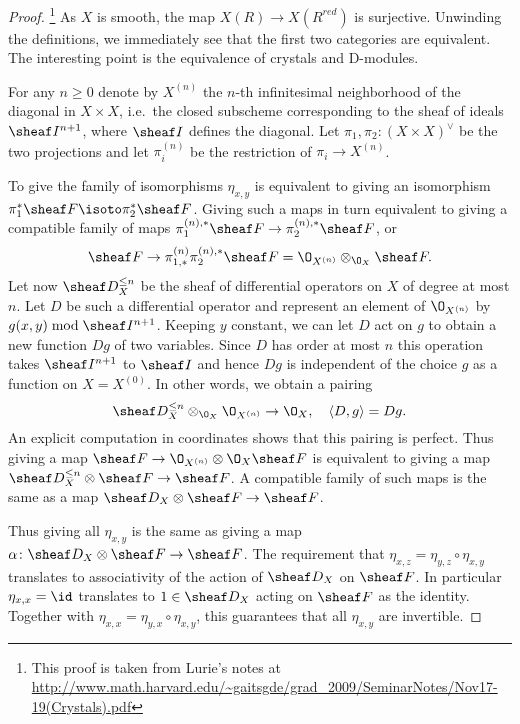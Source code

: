 \documentclass{ck-article}
\begin{document}
\begin{proof}\footnote{This proof is taken from Lurie's notes at \url{http://www.math.harvard.edu/~gaitsgde/grad_2009/SeminarNotes/Nov17-19(Crystals).pdf}}
    As $X$ is smooth, the map $X(R) \to X(R^{red})$ is surjective.
    Unwinding the definitions, we immediately see that the first two categories are equivalent.
    The interesting point is the equivalence of crystals and D-modules.

    For any $n \ge 0$ denote by $X^{(n)}$ the $n$-th infinitesimal  neighborhood of the diagonal in $X \times X$, i.e.~the closed subscheme corresponding to the sheaf of ideals $\sheaf I^{n+1}$, where $\sheaf I$ defines the diagonal.
    Let $\pi_1, \pi_2 \colon (X \times X)^\vee$ be the two projections and let $\pi_i^{(n)}$ be the restriction of $\pi_i \to X^{(n)}$.

    To give the family of isomorphisms $\eta_{x,y}$ is equivalent to giving an isomorphism $\pi_1^*\sheaf F \isoto \pi_2^*\sheaf F$.
    Giving such a maps in turn equivalent to giving a compatible family of maps $\pi_1^{(n),*}\sheaf F \to \pi_2^{(n),*}\sheaf F$, or
    \[
        \sheaf F \to \pi_{1,*}^{(n)}\pi_2^{(n),*}\sheaf F = \O_{X^{(n)}} \otimes_{\O_X} \sheaf F.
    \]
    Let now $\sheaf D_X^{\le n}$ be the sheaf of differential operators on $X$ of degree at most $n$.
    Let $D$ be such a differential operator and represent an element of $\O_{X^{(n)}}$ by $g(x,y) \bmod \sheaf I^{n+1}$.
    Keeping $y$ constant, we can let $D$ act on $g$ to obtain a new function $Dg$ of two variables.
    Since $D$ has order at most $n$ this operation takes $\sheaf I^{n+1}$ to $\sheaf I$ and hence $Dg$ is independent of the choice $g$ as a function on $X = X^{(0)}$.
    In other words, we obtain a pairing
    \[
        \sheaf D_X^{\le n} \otimes_{\O_X} \O_{X^{(n)}} \to \O_X, \quad \langle D, g\rangle = Dg.
    \]
    An explicit computation in coordinates shows that this pairing is perfect.
    Thus giving a map $\sheaf F \to \O_{X^{(n)}} \otimes \O_X \sheaf F$ is equivalent to giving a map $\sheaf D_X^{\le n} \otimes \sheaf F \to \sheaf F$.
    A compatible family of such maps is the same as a map $\sheaf D_X \otimes \sheaf F \to \sheaf F$.

    Thus giving all $\eta_{x,y}$ is the same as giving a map $\alpha\colon\sheaf D_X \otimes \sheaf F \to \sheaf F$.
    The requirement that $\eta_{x,z} = \eta_{y,z} \circ \eta_{x,y}$ translates to associativity of the action of $\sheaf D_X$ on $\sheaf F$.
    In particular $\eta_{x,x} = \id$ translates to $1 \in \sheaf D_X$ acting on $\sheaf F$ as the identity.
    Together with $\eta_{x,x} = \eta_{y,x} \circ \eta_{x,y}$, this guarantees that all $\eta_{x,y}$ are invertible.
\end{proof}
\end{document}
